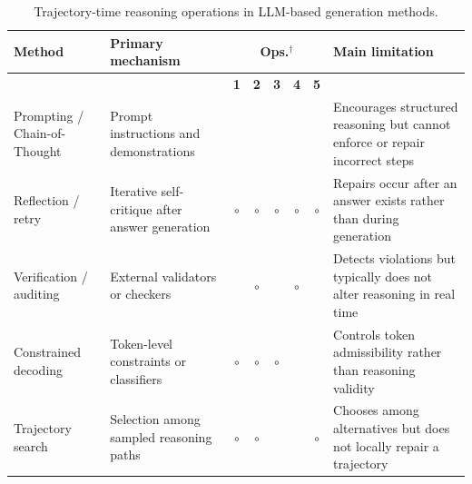 \documentclass[twocolumn]{article}
\newcommand{\cmark}{\ding{51}} \newcommand{\xmark}{\ding{55}}
\newcommand{\partialmark}{\(\circ\)}
\begin{document}
\begin{table}[t]
  \centering
  \scriptsize
  \setlength{\tabcolsep}{3.0pt}
  \renewcommand{\arraystretch}{1.12}

  \caption{Trajectory-time reasoning operations in LLM-based generation
  methods.}\label{tab:trajectory_operations}

  \begin{tabularx}{\textwidth}{ >{\raggedright\arraybackslash}p{}
      >{\raggedright\arraybackslash}p{} ccccc
      >{\raggedright\arraybackslash}X }
    \toprule

    Method & Primary mechanism & \multicolumn{5}{c}{Ops.$^{\dagger}$} & Main
    limitation \\

    \cmidrule(lr){3-7}

    & &
    \textbf{1}
    & \textbf{2} & \textbf{3} & \textbf{4} & \textbf{5} & \\

    \midrule

    Prompting / Chain-of-Thought & Prompt instructions and demonstrations &
    \cmark & \xmark & \xmark & \xmark & \xmark & Encourages structured reasoning
    but cannot enforce or repair incorrect steps
    \parencite{wei2022cot,wang2023selfconsistency} \\

    Reflection / retry & Iterative self-critique after answer generation &
    \partialmark & \partialmark & \partialmark & \partialmark & \partialmark &
    Repairs occur after an answer exists rather than during generation
    \parencite{shinn2023reflexion,bai2022constitutionalai} \\

    Verification / auditing & External validators or checkers & \xmark &
    \partialmark & \xmark & \partialmark & \xmark & Detects violations but
    typically does not alter reasoning in real time
    \parencite{lanham2023measuringfaithfulnesscot,lyu2023faithfulcot} \\

    Constrained decoding & Token-level constraints or classifiers & \partialmark
    & \partialmark & \partialmark & \xmark & \cmark & Controls token
    admissibility rather than reasoning validity
    \parencite{yang2021fudge,koo2024automata,srivatsa2024deal} \\

    Trajectory search & Selection among sampled reasoning paths & \partialmark &
    \partialmark & \xmark & \xmark & \partialmark & Chooses among alternatives
    but does not locally repair a trajectory
    \parencite{yao2023treeofthoughts,wang2023selfconsistency} \\


\end{tabularx}
\end{table}
\end{document}
